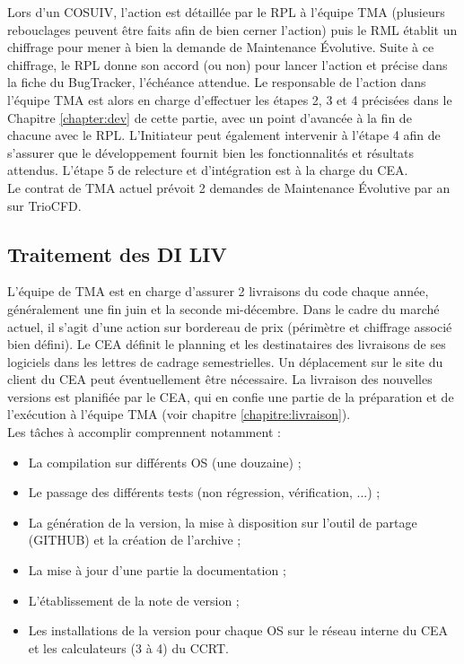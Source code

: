 Lors d'un COSUIV, l'action est détaillée par le RPL à l'équipe TMA (plusieurs rebouclages peuvent être faits afin de bien cerner l'action) puis le RML établit un chiffrage pour mener à bien la demande de Maintenance Évolutive. Suite à ce chiffrage, le RPL donne son accord (ou non) pour lancer l'action et précise dans la fiche du BugTracker, l'échéance attendue. Le responsable de l'action dans l'équipe TMA est alors en charge d'effectuer les étapes 2, 3 et 4 précisées dans le Chapitre \ref{chapter:dev} de cette partie, avec un point d'avancée à la fin de chacune avec le RPL. L'Initiateur peut également intervenir à l'étape 4 afin de s'assurer que le développement fournit bien les fonctionnalités et résultats attendus. L'étape 5 de relecture et d'intégration est à la charge du CEA. \\

Le contrat de TMA actuel prévoit 2 demandes de Maintenance Évolutive par an sur TrioCFD.

\subsection{Traitement des DI LIV}
L'équipe de TMA est en charge d'assurer 2 livraisons du code chaque année, généralement une fin juin et la seconde mi-décembre. Dans le cadre du marché actuel, il s'agit d'une action sur bordereau de prix (périmètre et chiffrage associé bien défini). Le CEA définit le planning et les destinataires des livraisons de ses logiciels dans les lettres de cadrage semestrielles. Un déplacement sur le site du client du CEA peut éventuellement être nécessaire. 
La livraison des nouvelles versions est planifi\'ee par le CEA, qui en confie une partie de la pr\'eparation et de l'ex\'ecution \`a l'\'equipe TMA (voir chapitre \ref{chapitre:livraison}).\\

Les t\^aches \`a accomplir comprennent notamment :
\begin{itemize}
    \item La compilation sur diff\'erents OS (une douzaine) ;
    \item Le passage des diff\'erents tests (non r\'egression, v\'erification, ...) ;
    \item La g\'en\'eration de la version, la mise à disposition sur l'outil de partage (GITHUB) et la création de l'archive ;
    \item La mise \`a jour d'une partie la documentation ; 
    \item L'\'etablissement de la note de version ;
    \item Les installations de la version pour chaque OS sur le r\'eseau interne du CEA et les calculateurs (3 \`a 4) du CCRT.
\end{itemize}


